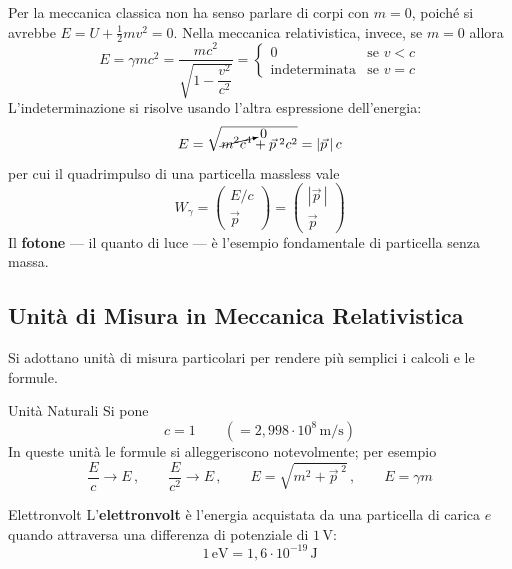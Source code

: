 Per la meccanica classica non ha senso parlare di corpi con $m = 0$, poiché si avrebbe $E = U + \frac{1}{2}mv^2 = 0$. Nella meccanica relativistica, invece, se $m = 0$ allora
\begin{equation}
    E = \gamma m c^2 = \frac{mc^2}{\sqrt{1 - \dfrac{v^2}{c^2}}} =
    \begin{cases}
        0 & \text{se } v < c \\
        \text{indeterminata} & \text{se } v = c
    \end{cases}
\end{equation}
L'indeterminazione si risolve usando l'altra espressione dell'energia:
\begin{equation}
    E = \sqrt{\cancelto{0}{m^2c^4} + \vec{p}^{\;2}c^2} = |\vec{p}\,|\,c
\end{equation}
per cui il quadrimpulso di una particella massless vale
\begin{equation}
    W_{\gamma} = \begin{pmatrix} E/c \\ \vec{p} \end{pmatrix} = \begin{pmatrix} |\vec{p}\,| \\ \vec{p} \end{pmatrix}
\end{equation}
Il \textbf{fotone} --- il quanto di luce --- è l'esempio fondamentale di particella senza massa.

\subsection{Unità di Misura in Meccanica Relativistica}

Si adottano unità di misura particolari per rendere più semplici i calcoli e le formule.

\begin{definizione}{Unità Naturali}
Si pone
\begin{equation}
    c = 1 \qquad (= 2{,}998 \cdot 10^8 \, \mathrm{m/s})
\end{equation}
In queste unità le formule si alleggeriscono notevolmente; per esempio
\begin{equation*}
    \frac{E}{c} \to E \, , \qquad \frac{E}{c^2} \to E \, , \qquad
    E = \sqrt{m^2 + \vec{p}^{\;2}} \, , \qquad E = \gamma m
\end{equation*}
\end{definizione}

\begin{definizione}{Elettronvolt}
L'\textbf{elettronvolt} è l'energia acquistata da una particella di carica $e$ quando attraversa una differenza di potenziale di $1 \, \mathrm{V}$:
\begin{equation}
    1 \, \mathrm{eV} = 1{,}6 \cdot 10^{-19} \, \mathrm{J}
\end{equation}
\end{definizione}

